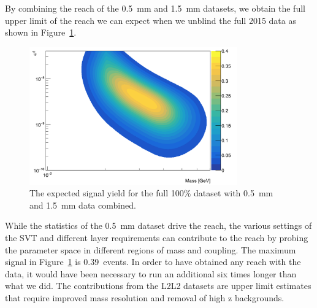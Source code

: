 By combining the reach of the 0.5~mm and 1.5~mm datasets, we obtain the full upper limit of the reach we can expect when we unblind the full 2015 data as shown in Figure~\ref{fig:reachall}.

\begin{figure}[H]
  \centering
     \includegraphics[width=0.8\textwidth]{plots/reachall.png}
  \caption{The expected signal yield for the full 100$\%$ dataset with 0.5~mm and 1.5~mm data combined.}
  \label{fig:reachall}
\end{figure} 

While the statistics of the 0.5~mm dataset drive the reach, the various settings of the SVT and different layer requirements can contribute to the reach by probing the parameter space in different regions of mass and coupling. The maximum signal in  Figure~\ref{fig:reachall} is 0.39~events. In order to have obtained any reach with the data, it would have been necessary to run an additional six times longer than what we did. 
\indent The contributions from the L2L2 datasets are upper limit estimates that require improved mass resolution and removal of high z backgrounds. 
